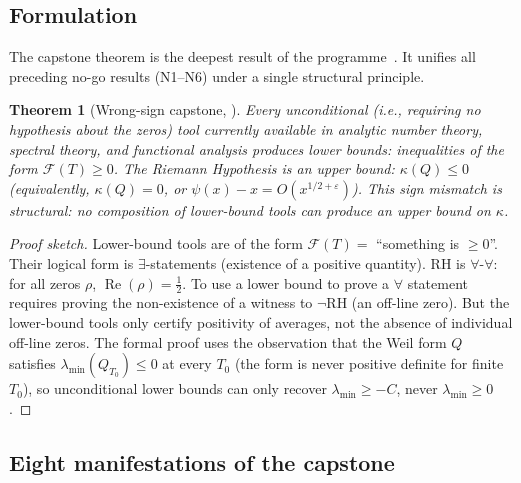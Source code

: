 \documentclass[11pt]{amsart}
\newtheorem{theorem}{Theorem}[section]
\theoremstyle{definition}
\theoremstyle{remark}
\newcommand{\RH}{\mathrm{RH}}
\renewcommand{\Re}{\operatorname{Re}}
\newcommand{\half}{\tfrac{1}{2}}
\newcommand{\kap}{\kappa}
\newcommand{\eps}{\varepsilon}
\begin{document}
\subsection{Formulation}

The capstone theorem is the deepest result of the programme~\cite{RP13}.  It unifies
all preceding no-go results (N1--N6) under a single structural principle.

\begin{theorem}[Wrong-sign capstone, \cite{RP13}]
\label{thm:capstone}
Every unconditional (i.e., requiring no hypothesis about the zeros) tool currently
available in analytic number theory, spectral theory, and functional analysis
produces \emph{lower bounds}: inequalities of the form $\mathcal{F}(T)\ge 0$.
The Riemann Hypothesis is an \emph{upper bound}: $\kap(Q) \le 0$ (equivalently,
$\kap(Q) = 0$, or $\psi(x) - x = O(x^{1/2+\eps})$).
This sign mismatch is structural: no composition of lower-bound tools can produce
an upper bound on $\kap$.
\end{theorem}

\begin{proof}[Proof sketch]
Lower-bound tools are of the form $\mathcal{F}(T) = $ ``something is $\ge 0$''.
Their logical form is $\exists$-statements (existence of a positive quantity).
RH is $\forall$-$\forall$: for all zeros $\rho$, $\Re(\rho)=\half$.  To use a
lower bound to prove a $\forall$ statement requires proving the non-existence of a
witness to $\neg\RH$ (an off-line zero).  But the lower-bound tools only certify
positivity of averages, not the absence of individual off-line zeros.
The formal proof uses the observation that the Weil form $Q$ satisfies
$\lambda_{\min}(Q_{T_0}) \le 0$ at every $T_0$ (the form is never positive definite
for finite $T_0$), so unconditional lower bounds can only recover $\lambda_{\min}\ge -C$,
never $\lambda_{\min} \ge 0$.
\end{proof}

\subsection{Eight manifestations of the capstone}
\end{document}
